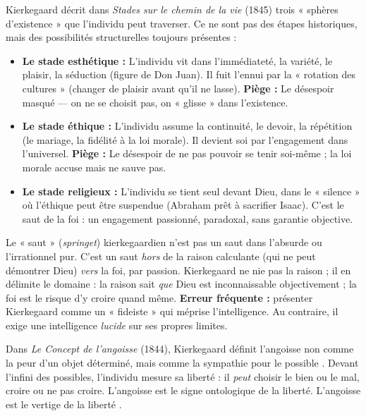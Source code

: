 \documentclass[11pt]{article}
\newcommand{\cle}[1]{{\popxbold\color{popdark}#1}}
\begin{document}
\begin{exemplebox}
Kierkegaard décrit dans \emph{Stades sur le chemin de la vie} (1845) trois « sphères d'existence » que l'individu peut traverser. Ce ne sont pas des étapes historiques, mais des \cle{possibilités} structurelles toujours présentes :
\begin{itemize}
\item \textbf{Le stade esthétique :} L'individu vit dans l'immédiateté, la variété, le plaisir, la séduction (figure de Don Juan). Il fuit l'ennui par la « rotation des cultures » (changer de plaisir avant qu'il ne lasse). \textbf{Piège :} Le désespoir masqué — on ne se choisit pas, on « glisse » dans l'existence.
\item \textbf{Le stade éthique :} L'individu assume la continuité, le devoir, la répétition (le mariage, la fidélité à la loi morale). Il devient \cle{soi} par l'engagement dans l'universel. \textbf{Piège :} Le désespoir de ne pas pouvoir se tenir soi-même ; la loi morale accuse mais ne sauve pas.
\item \textbf{Le stade religieux :} L'individu se tient seul devant Dieu, dans le « silence » où l'éthique peut être suspendue (Abraham prêt à sacrifier Isaac). C'est le \cle{saut de la foi} : un engagement passionné, paradoxal, sans garantie objective.
\end{itemize}
\end{exemplebox}

\begin{attention}
Le « saut » (\emph{springet}) kierkegaardien n'est pas un saut dans l'absurde ou l'irrationnel pur. C'est un saut \emph{hors} de la raison calculante (qui ne peut démontrer Dieu) \emph{vers} la foi, par passion. Kierkegaard ne nie pas la raison ; il en délimite le domaine : la raison sait \emph{que} Dieu est inconnaissable objectivement ; la foi est le risque d'y croire quand même. \textbf{Erreur fréquente :} présenter Kierkegaard comme un « fideiste » qui méprise l'intelligence. Au contraire, il exige une intelligence \emph{lucide} sur ses propres limites.
\end{attention}

\begin{propriete}
Dans \emph{Le Concept de l'angoisse} (1844), Kierkegaard définit l'angoisse non comme la peur d'un objet déterminé, mais comme \guillemotleft la sympathie pour le possible \guillemotright. Devant l'infini des possibles, l'individu mesure sa liberté : il \emph{peut} choisir le bien ou le mal, croire ou ne pas croire. L'angoisse est le signe ontologique de la liberté. \guillemotleft L'angoisse est le vertige de la liberté \guillemotright.
\end{propriete}
\end{document}
